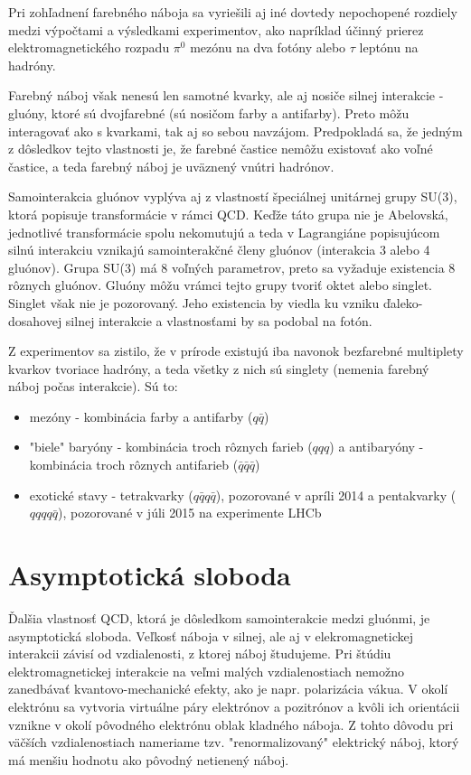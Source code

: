 \documentclass[thesismargins, thesislinespacing]{rnthesis}
\begin{document}
Pri zohľadnení farebného náboja sa vyriešili aj iné dovtedy nepochopené rozdiely medzi výpočtami a výsledkami experimentov, ako napríklad účinný prierez elektromagnetického rozpadu $\pi^0$ mezónu na dva fotóny alebo $\tau$ leptónu na hadróny. 

Farebný náboj však nenesú len samotné kvarky, ale aj nosiče silnej interakcie - gluóny, ktoré sú dvojfarebné (sú nosičom farby a antifarby). Preto môžu interagovať ako s kvarkami, tak aj so sebou navzájom. Predpokladá sa, že jedným z dôsledkov tejto vlastnosti je, že farebné častice nemôžu existovať ako voľné častice, a teda farebný náboj je uväznený vnútri hadrónov.

Samointerakcia gluónov vyplýva aj z vlastností špeciálnej unitárnej grupy SU(3), ktorá popisuje transformácie v rámci QCD. Keďže táto grupa nie je Abelovská, jednotlivé transformácie spolu nekomutujú a teda v Lagrangiáne popisujúcom silnú interakciu vznikajú samointerakčné členy gluónov (interakcia 3 alebo 4 gluónov). Grupa SU(3) má 8 voľných parametrov, preto sa vyžaduje existencia 8 rôznych gluónov. Gluóny môžu vrámci tejto grupy tvoriť oktet alebo singlet. Singlet však nie je pozorovaný. Jeho existencia by viedla ku vzniku ďaleko-dosahovej silnej interakcie a vlastnosťami by sa podobal na fotón. 

Z experimentov sa zistilo, že v prírode existujú iba navonok bezfarebné multiplety kvarkov tvoriace hadróny, a teda všetky z nich sú singlety (nemenia farebný náboj počas interakcie). Sú to:
\begin{itemize}
	\item mezóny - kombinácia farby a antifarby ($q \bar q$)
	\item "biele" baryóny - kombinácia troch rôznych farieb ($qqq$) a antibaryóny - kombinácia troch rôznych antifarieb ($\bar q \bar q \bar q$)
	\item exotické stavy - tetrakvarky ($q \bar q q \bar q$), pozorované v apríli 2014 \cite{tetra} a pentakvarky ($qqqq \bar q $), pozorované v júli 2015 na experimente LHCb \cite{2}
\end{itemize}

\section{Asymptotická sloboda}
Ďalšia vlastnosť QCD, ktorá je dôsledkom samointerakcie medzi gluónmi, je asymptotická sloboda. 
Veľkosť náboja v silnej, ale aj v elekromagnetickej interakcii závisí od vzdialenosti, z ktorej náboj študujeme. Pri štúdiu elektromagnetickej interakcie na veľmi malých vzdialenostiach nemožno zanedbávať kvantovo-mechanické efekty, ako je napr. polarizácia vákua. V okolí elektrónu sa vytvoria virtuálne páry elektrónov a pozitrónov a kvôli ich  orientácii vznikne v okolí pôvodného elektrónu oblak kladného náboja. Z tohto dôvodu pri väčších vzdialenostiach nameriame tzv. "renormalizovaný" \-e\-lektrický náboj, ktorý má menšiu hodnotu ako pôvodný netienený náboj.
\end{document}

